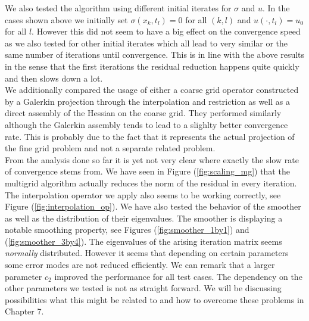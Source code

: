 \documentclass[../draft_1.tex]{subfiles}
\begin{document}



We also tested the algorithm using different initial iterates for $\sigma$ and $u$. In the cases shown above we initially set $\sigma(x_k, t_l) = 0$ for all $(k, l)$ and $u(\cdot, t_l) = u_0$ for all $l$. However this did not seem to have a big effect on the convergence speed as we also tested for other initial iterates which all lead to very similar or the same number of iterations until convergence. This is in line with the above results in the sense that the first iterations the residual reduction happens quite quickly and then slows down a lot. 
 \smallskip
 \\
 We additionally compared the usage of either a coarse grid operator constructed by a Galerkin projection through the interpolation and restriction as well as a direct assembly of the Hessian on the coarse grid. They performed similarly although the Galerkin assembly tends to lead to a slighlty better convergence rate. This is probably due to the fact that it represents the actual projection of the fine grid problem and not a separate related problem.
 \smallskip
 \\
 From the analysis done so far it is yet not very clear where exactly the slow rate of convergence stems from. We have seen in Figure (\ref{fig:scaling_mg}) that the multigrid algorithm actually reduces the norm of the residual in every iteration. The interpolation operator we apply also seems to be working correctly, see Figure (\ref{fig:interpolation_op}). We have also tested the behavior of the smoother as well as the distribution of their eigenvalues. The smoother is displaying a notable smoothing property, see Figures (\ref{fig:smoother_1by1}) and (\ref{fig:smoother_3by4}). The eigenvalues of the arising iteration matrix seems \textit{normally} distributed. However it seems that depending on certain parameters some error modes are not reduced efficiently. We can remark that a larger parameter $c_2$ improved the performance for all test cases. The dependency on the other parameters we tested is not as straight forward. We will be discussing possibilities what this might be related to and how to overcome these problems in Chapter 7. 
\end{document}
